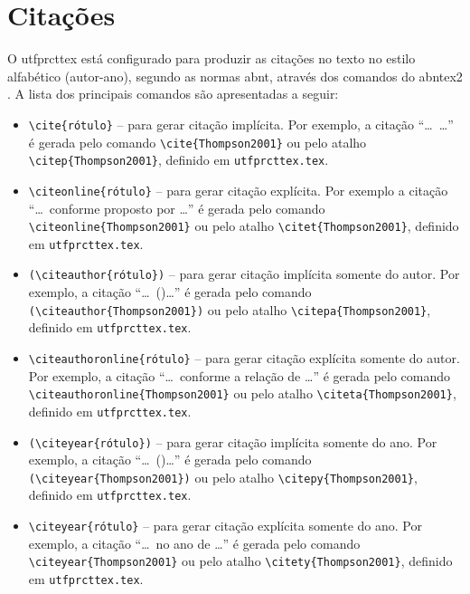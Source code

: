 \section{Citações}\label{sec:citacoes}

O \gls{utfprcttex} está configurado para produzir as citações no texto no estilo alfabético (autor-ano), segundo as normas \gls{abnt}, através dos comandos do \gls{abntex2} \cite{abnTeX2:2013Cite,abnTeX2:2013CiteAlf}. A lista dos principais comandos são apresentadas a seguir:

\begin{itemize}%
\item \verb|\cite{rótulo}| -- para gerar citação implícita. Por exemplo, a citação ``\ldots\ \cite{Thompson2001}\ldots'' é gerada pelo comando \verb|\cite{Thompson2001}| ou pelo atalho \verb|\citep{Thompson2001}|, definido em \texttt{utfprcttex.tex}.
\item \verb|\citeonline{rótulo}| -- para gerar citação explícita. Por exemplo a citação ``\ldots\ conforme proposto por \ldots'' é gerada pelo comando \verb|\citeonline{Thompson2001}| ou pelo atalho \verb|\citet{Thompson2001}|, definido em \texttt{utfprcttex.tex}.
\item \verb|(\citeauthor{rótulo})| -- para gerar citação implícita somente do autor. Por exemplo, a citação ``\ldots\ (\citeauthor{Thompson2001})\ldots'' é gerada pelo comando \verb|(\citeauthor{Thompson2001})| ou pelo atalho \verb|\citepa{Thompson2001}|, definido em \texttt{utfprcttex.tex}.
\item \verb|\citeauthoronline{rótulo}| -- para gerar citação explícita somente do autor. Por exemplo, a citação ``\ldots\ conforme a relação de \ldots'' é gerada pelo comando \verb|\citeauthoronline{Thompson2001}| ou pelo atalho \verb|\citeta{Thompson2001}|, definido em \texttt{utfprcttex.tex}.
\item \verb|(\citeyear{rótulo})| -- para gerar citação implícita somente do ano. Por exemplo, a citação ``\ldots\ (\citeyear{Thompson2001})\ldots'' é gerada pelo comando \verb|(\citeyear{Thompson2001})| ou pelo atalho \verb|\citepy{Thompson2001}|, definido em \texttt{utfprcttex.tex}.
\item \verb|\citeyear{rótulo}| -- para gerar citação explícita somente do ano. Por exemplo, a citação ``\ldots\ no ano de \citeyear{Thompson2001}\ldots'' é gerada pelo comando \verb|\citeyear{Thompson2001}| ou pelo atalho \verb|\citety{Thompson2001}|, definido em \texttt{utfprcttex.tex}.
\end{itemize}


